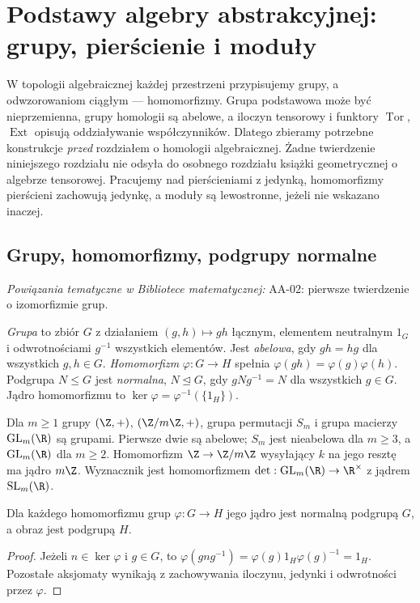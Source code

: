 \chapter{Podstawy algebry abstrakcyjnej: grupy, pierścienie i moduły}
\label{ch:algebra-abstrakcyjna-v5}

\providecommand{\atlasref}[2]{#2}


W topologii algebraicznej każdej przestrzeni przypisujemy grupy, a odwzorowaniom
ciągłym --- homomorfizmy. Grupa podstawowa może być nieprzemienna, grupy
homologii są abelowe, a iloczyn tensorowy i funktory $\operatorname{Tor}$,
$\operatorname{Ext}$ opisują oddziaływanie współczynników. Dlatego zbieramy
potrzebne konstrukcje \emph{przed} rozdziałem o homologii algebraicznej.
Żadne twierdzenie niniejszego rozdziału nie odsyła do osobnego rozdziału
książki geometrycznej o algebrze tensorowej. Pracujemy nad pierścieniami
z jedynką, homomorfizmy pierścieni zachowują jedynkę, a moduły są lewostronne,
jeżeli nie wskazano inaczej.

\section{Grupy, homomorfizmy, podgrupy normalne}

\noindent\emph{Powiązania tematyczne w Bibliotece matematycznej:} \atlasref{AA-02::aa:tw:izo-pierwsze}{AA-02: pierwsze twierdzenie o izomorfizmie grup}.

\begin{definicja}
\emph{Grupa} to zbiór $G$ z działaniem $(g,h)\mapsto gh$ łącznym,
elementem neutralnym $1_G$ i odwrotnościami $g^{-1}$ wszystkich elementów.
Jest \emph{abelowa}, gdy $gh=hg$ dla wszystkich $g,h\in G$.
\emph{Homomorfizm} $\varphi:G\to H$ spełnia
$\varphi(gh)=\varphi(g)\varphi(h)$. Podgrupa $N\leq G$ jest
\emph{normalna}, $N\trianglelefteq G$, gdy $gNg^{-1}=N$ dla wszystkich
$g\in G$. Jądro homomorfizmu to $\ker\varphi=\varphi^{-1}(\{1_H\})$.
\end{definicja}
\begin{przyklad}
Dla $m\geq1$ grupy $(\Z,+)$, $(\Z/m\Z,+)$,
grupa permutacji $S_m$ i grupa macierzy $\mathrm{GL}_m(\R)$
są grupami. Pierwsze dwie są abelowe;
$S_m$ jest nieabelowa dla $m\geq3$, a
$\mathrm{GL}_m(\R)$ dla $m\geq2$. Homomorfizm $\Z\to \Z/m\Z$ wysyłający $k$ na jego
resztę ma jądro $m\Z$. Wyznacznik jest homomorfizmem
$\det:\mathrm{GL}_m(\R)\to\R^\times$ z jądrem
$\mathrm{SL}_m(\R)$.
\end{przyklad}
\begin{stwierdzenie}
Dla każdego homomorfizmu grup $\varphi:G\to H$ jego jądro jest
normalną podgrupą $G$, a obraz jest podgrupą $H$.
\end{stwierdzenie}
\begin{proof}
Jeżeli $n\in\ker\varphi$ i $g\in G$, to
$\varphi(gng^{-1})=\varphi(g)1_H\varphi(g)^{-1}=1_H$.
Pozostałe aksjomaty wynikają z zachowywania iloczynu, jedynki
i odwrotności przez $\varphi$.
\end{proof}

